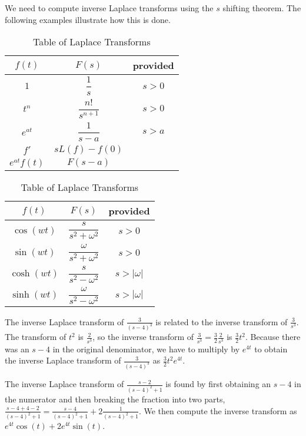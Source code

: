 We need to compute inverse Laplace transforms using the $s$ shifting theorem. The following examples illustrate how this is done.

\begin{table}
\begin{center}
\begin{tabular}[t]{|c|cc|}
\hline
$f(t)$ & $F(s)$ & provided\\
\hline\hline
$1$					&$\dfrac{1}{s}$ 							&$s>0$\\\hline
$t^n$				&$\dfrac{n!}{s^{n+1}}$ 			&$s>0$\\\hline
$e^{at}$		&$\dfrac{1}{s-a}$ 			&$s>a$\\\hline
$f'$					&$sL(f)-f(0)$ 						&\\\hline
$e^{at}f(t)$  &$F(s-a)$ 						&\\\hline
\end{tabular}
\quad
\begin{tabular}[t]{|c|cc|}
\hline
$f(t)$ & $F(s)$ & provided\\
\hline\hline
$\cos(wt)$  &$\dfrac{s}{s^2+\omega^2}$ 			&$s>0$\\\hline
$\sin(wt)$  &$\dfrac{\omega}{s^2+\omega^2}$ 			&$s>0$\\\hline
$\cosh(wt)$ &$\dfrac{s}{s^2-\omega^2}$ 			&$s>|\omega|$\\\hline
$\sinh(wt)$ &$\dfrac{\omega}{s^2-\omega^2}$ 			&$s>|\omega|$\\\hline
\end{tabular}

\caption{Table of Laplace Transforms}
\label{laplacetable2}
\end{center}
\end{table}

\begin{example}
The inverse Laplace transform of $\frac{3}{(s-4)^3}$ is related to the inverse transform of $\frac{3}{s^3}$. The transform of $t^2$ is $\frac{2}{s^3}$, so the inverse transform of $\frac{3}{s^3}=\frac{3}{2}\frac{2}{s^3}$ is $\frac{3}{2}t^2$.  Because there was an $s-4$ in the original denominator, we have to multiply by $e^{4t}$ to obtain the inverse Laplace transform of $\frac{3}{(s-4)^3}$ as $\frac{3}{2}t^2e^{4t}$.  
\end{example}

\begin{example}
The inverse Laplace transform of $\frac{s-2}{(s-4)^2+1}$ is found by first obtaining an $s-4$ in the numerator and then breaking the fraction into two parts, $\frac{s-4+4-2}{(s-4)^2+1} = \frac{s-4}{(s-4)^2+1}+2\frac{1}{(s-4)^2+1}$. We then compute the inverse transform as $e^{4t}\cos(t) + 2e^{4t}\sin(t)$.  
\end{example}

